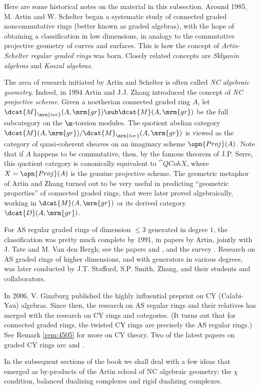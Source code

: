 \begin{rem} \label{rem:4653}
Here are some historical notes on the material in this subsection. 
Around 1985, M. Artin and W. Schelter \cite{ArSchl} began a systematic study of 
connected graded noncommutative rings (better known as graded algebras), with 
the hope of obtaining a classification in low dimensions, in analogy to the 
commutative projective geometry of curves and surfaces. This is how the concept 
of {\em Artin-Schelter regular graded rings} was born. 
Closely related concepts are {\em Sklyanin algebras} and {\em Koszul algebras}. 

The area of research initiated by Artin and Schelter is often called 
{\em NC algebraic geometry}. Indeed, in 1994 Artin and J.J. Zhang \cite{ArZh} 
introduced the concept of {\em NC projective scheme}. Given a noetherian 
connected graded ring $A$, let 
$\dcat{M}_{\mrm{tor}}(A, \mrm{gr}) \sub \dcat{M}(A, \mrm{gr})$
be the full subcategory on the $\m$-torsion modules. The quotient abelian 
category $\dcat{M}(A, \mrm{gr}) / \dcat{M}_{\mrm{tor}}(A, \mrm{gr})$
is viewed as the category of quasi-coherent sheaves on an imaginary scheme  
$\opn{Proj}(A)$. Note that if $A$ happens to be commutative, then, by the 
famous theorem of J.P. Serre, this quotient category is canonically equivalent 
to $\cat{QCoh} X$, where $X = \opn{Proj}(A)$ is the genuine projective scheme. 
The geometric metaphor of Artin and Zhang turned out to be very useful in 
predicting ``geometric properties'' of connected graded rings, that were later 
proved algebraically, working in $\dcat{M}(A, \mrm{gr})$ or its derived 
category $\dcat{D}(A, \mrm{gr})$. 

For AS regular graded rings of dimension $\leq 3$ generated in degree $1$, the 
classification was pretty much complete by 1991, in papers by Artin, jointly 
with J. Tate and M. Van den Bergh; see the papers \cite{ATV} and 
\cite{ATV2}, and the survey \cite{StaVdB}. Research on AS graded rings of 
higher dimensions, and with generators in various degrees, was later conducted 
by J.T. Stafford, S.P. Smith, Zhang, and their students and collaborators. 

In 2006, V. Ginzburg published the highly influential preprint \cite{Ginz} on 
CY (Calabi-Yau) algebras. Since then, the research on AS regular rings and 
their relatives has merged with the research on CY rings and categories. 
(It turns out that for connected graded rings, the twisted CY rings are 
precisely the AS regular rings.) See Remark \ref{rem:4505} for more on CY 
theory. Two of the latest papers on graded CY rings are 
\cite{ReRoZh} and \cite{ReRo}. 

In the subsequent sections of the book we shall deal with a few ideas that 
emerged as by-products of the Artin school of NC algebraic geometry: the $\chi$ 
condition, balanced dualizing complexes and rigid dualizing complexes.
\end{rem}








